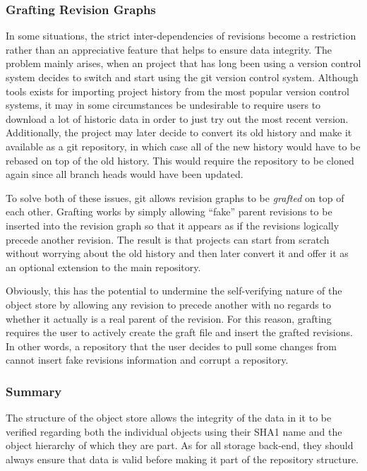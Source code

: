 \subsubsection{Grafting Revision Graphs}
\label{sec:grafting}

In some situations, the strict inter-dependencies of revisions become
a restriction rather than an appreciative feature that helps to ensure
data integrity. The problem mainly arises, when an project that has
long been using a version control system decides to switch and start
using the git version control system. Although tools exists for
importing project history from the most popular version control
systems, it may in some circumstances be undesirable to require users
to download a lot of historic data in order to just try out the most
recent version. Additionally, the project may later decide to
convert its old history and make it available as a git repository, in
which case all of the new history would have to be rebased on top of
the old history. This would require the repository to be cloned again
since all branch heads would have been updated.

To solve both of these issues, git allows revision graphs to be
\emph{grafted} on top of each other. Grafting works by simply allowing
``fake'' parent revisions to be inserted into the revision graph so
that it appears as if the revisions logically precede another
revision. The result is that projects can start from scratch without
worrying about the old history and then later convert it and offer it
as an optional extension to the main repository.

Obviously, this has the potential to undermine the self-verifying
nature of the object store by allowing any revision to precede another
with no regards to whether it actually is a real parent of the
revision. For this reason, grafting requires the user to actively
create the graft file and insert the grafted revisions. In other
words, a repository that the user decides to pull some changes from
cannot insert fake revisions information and corrupt a repository.

\subsubsection*{Summary}

The structure of the object store allows the integrity of the data in
it to be verified regarding both the individual objects using their
SHA1 name and the object hierarchy of which they are part. As for all
storage back-end, they should always ensure that data is valid before
making it part of the repository structure.

